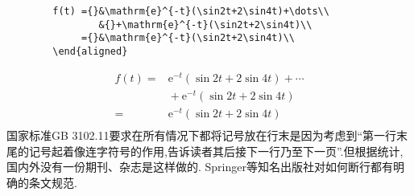 \documentclass[a4paper]{article}
\begin{document}
\begin{compactitem}[\hspace{1.02em}$\bullet$]
\begin{verbatim}
		f(t) ={}&\mathrm{e}^{-t}(\sin2t+2\sin4t)+\dots\\
		        &{}+\mathrm{e}^{-t}(\sin2t+2\sin4t)\\
		     ={}&\mathrm{e}^{-t}(\sin2t+2\sin4t)\\
		\end{aligned}
	\end{verbatim}
	$$
	\begin{aligned}
		f(t) ={}&\mathrm{e}^{-t}(\sin2t+2\sin4t)+\cdots\\
		        &{}+\mathrm{e}^{-t}(\sin2t+2\sin4t)\\
		={}&\mathrm{e}^{-t}(\sin2t+2\sin4t)\\
	\end{aligned}
	$$
	国家标准GB 3102.11要求在所有情况下都将记号放在行末是因为考虑到``第一行末尾的记号起着像连字符号的作用,告诉读者其后接下一行乃至下一页''.但根据统计,国内外没有一份期刊、杂志是这样做的. Springer等知名出版社对如何断行都有明确的条文规范.\eop
\end{compactitem}
\end{document}

